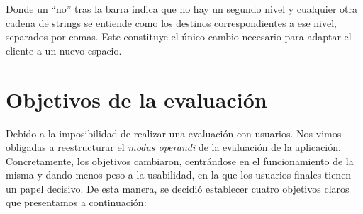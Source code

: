 % 

%

Donde un ``no'' tras la barra indica que no hay un segundo nivel y cualquier otra cadena de strings se entiende como los destinos correspondientes a ese nivel, separados por comas. Este constituye el único cambio necesario para adaptar el cliente a un nuevo espacio.

\section{Objetivos de la evaluación}
\label{sec:objetivosEval}

Debido a la imposibilidad de realizar una evaluación con usuarios. Nos vimos obligadas a reestructurar el \textit{modus operandi} de la evaluación de la aplicación. Concretamente, los objetivos cambiaron, centrándose en el funcionamiento de la misma y dando menos peso a la usabilidad, en la que los usuarios finales tienen un papel decisivo. De esta manera, se decidió establecer cuatro objetivos claros que presentamos a continuación:

